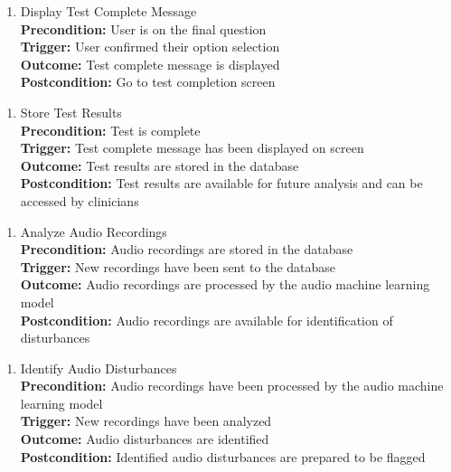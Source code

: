 \documentclass[12pt]{article}
\begin{document}
\begin{enumerate}[{PUC-}21. ]
  \item Display Test Complete Message\\
  \textbf{Precondition: }User is on the final question\\
  \textbf{Trigger: }User confirmed their option selection\\
  \textbf{Outcome: }Test complete message is displayed\\
  \textbf{Postcondition: }Go to test completion screen\\
\end{enumerate}

\begin{enumerate}[{PUC-}22. ]
  \item Store Test Results\\
  \textbf{Precondition: }Test is complete\\
  \textbf{Trigger: }Test complete message has been displayed on screen\\
  \textbf{Outcome: }Test results are stored in the database\\
  \textbf{Postcondition: }Test results are available for future analysis and can be accessed by clinicians\\
\end{enumerate}

\begin{enumerate}[{PUC-}23. ]
  \item Analyze Audio Recordings\\
  \textbf{Precondition: }Audio recordings are stored in the database\\
  \textbf{Trigger: }New recordings have been sent to the database\\
  \textbf{Outcome: }Audio recordings are processed by the audio machine learning model\\
  \textbf{Postcondition: }Audio recordings are available for identification of disturbances\\
\end{enumerate}

\begin{enumerate}[{PUC-}24. ]
  \item Identify Audio Disturbances\\
  \textbf{Precondition: }Audio recordings have been processed by the audio machine learning model\\
  \textbf{Trigger: }New recordings have been analyzed\\
  \textbf{Outcome: }Audio disturbances are identified\\
  \textbf{Postcondition: }Identified audio disturbances are prepared to be flagged\\
\end{enumerate}
\end{document}
